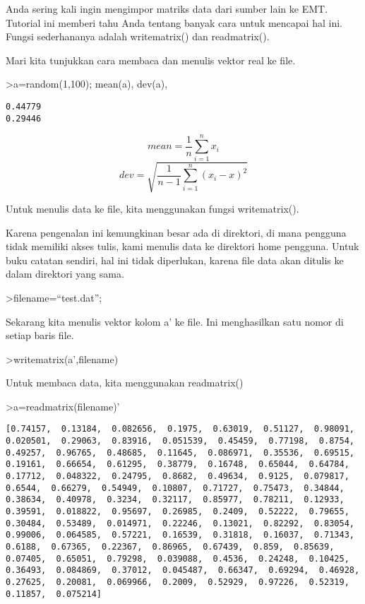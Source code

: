 \documentclass[
]{book}
\begin{document}
Anda sering kali ingin mengimpor matriks data dari sumber lain ke EMT. Tutorial ini memberi tahu Anda tentang banyak cara untuk mencapai hal ini. Fungsi sederhananya adalah writematrix() dan readmatrix().

Mari kita tunjukkan cara membaca dan menulis vektor real ke file.

\textgreater a=random(1,100); mean(a), dev(a),

\begin{verbatim}
0.44779
0.29446
\end{verbatim}

\[mean= \frac{1}{n} \sum_{i=1}^n x_i\] \[dev= \sqrt{\frac{1}{n-1}\sum_{i=1}^n(x_i-x)^2}\]

Untuk menulis data ke file, kita menggunakan fungsi writematrix().

Karena pengenalan ini kemungkinan besar ada di direktori, di mana pengguna tidak memiliki akses tulis, kami menulis data ke direktori home pengguna. Untuk buku catatan sendiri, hal ini tidak diperlukan, karena file data akan ditulis ke dalam direktori yang sama.

\textgreater filename=``test.dat'';

Sekarang kita menulis vektor kolom a' ke file. Ini menghasilkan satu nomor di setiap baris file.

\textgreater writematrix(a',filename)

Untuk membaca data, kita menggunakan readmatrix()

\textgreater a=readmatrix(filename)'

\begin{verbatim}
[0.74157,  0.13184,  0.082656,  0.1975,  0.63019,  0.51127,  0.98091,
0.020501,  0.29063,  0.83916,  0.051539,  0.45459,  0.77198,  0.8754,
0.49257,  0.96765,  0.48685,  0.11645,  0.086971,  0.35536,  0.69515,
0.19161,  0.66654,  0.61295,  0.38779,  0.16748,  0.65044,  0.64784,
0.17712,  0.048322,  0.24795,  0.8682,  0.49634,  0.9125,  0.079817,
0.6544,  0.66279,  0.54949,  0.10807,  0.71727,  0.75473,  0.34844,
0.38634,  0.40978,  0.3234,  0.32117,  0.85977,  0.78211,  0.12933,
0.39591,  0.018822,  0.95697,  0.26985,  0.2409,  0.52222,  0.79655,
0.30484,  0.53489,  0.014971,  0.22246,  0.13021,  0.82292,  0.83054,
0.99006,  0.064585,  0.57221,  0.16539,  0.31818,  0.16037,  0.71343,
0.6188,  0.67365,  0.22367,  0.86965,  0.67439,  0.859,  0.85639,
0.07405,  0.65051,  0.79298,  0.039088,  0.4536,  0.24248,  0.10425,
0.36493,  0.084869,  0.37012,  0.045487,  0.66347,  0.69294,  0.46928,
0.27625,  0.20081,  0.069966,  0.2009,  0.52929,  0.97226,  0.52319,
0.11857,  0.075214]
\end{verbatim}
\end{document}
